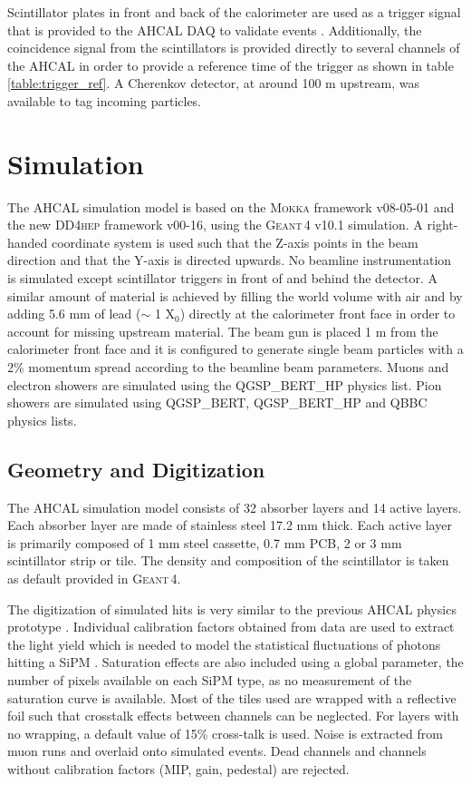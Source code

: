 \documentclass{JINST}
\newcommand\geant{\textsc{Geant\,4}\xspace}
\newcommand\mokka{\textsc{Mokka}\xspace}
\newcommand\ddhep{\textsc{DD4hep}\xspace}
\begin{document}
Scintillator plates in front and back of the calorimeter are used as a trigger signal that is provided to the AHCAL DAQ to validate events \cite{Kvasnicka:CR_IEEE2016}. Additionally, the coincidence signal from the scintillators is provided directly to several channels of the AHCAL in order to provide a reference time of the trigger as shown in table \ref{table:trigger_ref}. A Cherenkov detector, at around 100 m upstream, was available to tag incoming particles.

\section{Simulation}

The AHCAL simulation model is based on the \mokka \cite{MoradeFreitas:2002kj} framework v08-05-01 and the new \ddhep \cite{Frank:2014zya} framework v00-16, using the \geant v10.1 simulation. A right-handed coordinate system is used such that the Z-axis points in the beam direction and that the Y-axis is directed upwards. No beamline instrumentation is simulated except scintillator triggers in front of and behind the detector. A similar amount of material is achieved by filling the world volume with air and by adding 5.6 mm of lead ($\sim$ 1 X$_0$) directly at the calorimeter front face in order to account for missing upstream material. The beam gun is placed 1 m from the calorimeter front face and it is configured to generate single beam particles with a 2\% momentum spread according to the beamline beam parameters. Muons and electron showers are simulated using the QGSP\_BERT\_HP physics list. Pion showers are simulated using QGSP\_BERT, QGSP\_BERT\_HP and QBBC physics lists.

\subsection{Geometry and Digitization}
\label{sec:GeoDigi}

The AHCAL simulation model consists of 32 absorber layers and 14 active layers. Each absorber layer are made of stainless steel 17.2 mm thick. Each active layer is primarily composed of 1 mm steel cassette, 0.7 mm PCB, 2 or 3 mm scintillator strip or tile. The density and composition of the scintillator is taken as default provided in \geant.

The digitization of simulated hits is very similar to the previous AHCAL physics prototype \cite{1748-0221-5-05-P05004}. Individual calibration factors obtained from data are used to extract the light yield which is needed to model the statistical fluctuations of photons hitting a SiPM \cite{Hartbrich:2016bbz}. Saturation effects are also included using a global parameter, the number of pixels available on each SiPM type, as no measurement of the saturation curve is available. Most of the tiles used are wrapped with a reflective foil such that crosstalk effects between channels can be neglected. For layers with no wrapping, a default value of 15\% cross-talk is used. Noise is extracted from muon runs and overlaid onto simulated events. Dead channels and channels without calibration factors (MIP, gain, pedestal) are rejected.
\end{document}
